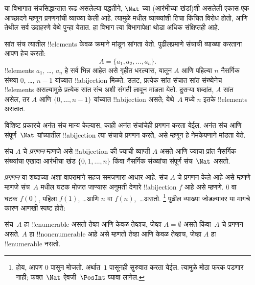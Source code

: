 \documentclass[../../../include/open-logic-section]{subfiles}
\begin{document}


\begin{editorial}
  या विभागात संचसिद्धान्तात रूढ असलेल्या पद्धतीने, $\Nat$ च्या
  (आरंभीच्या खंडां)शी असलेली एकास-एक आच्छादने म्हणून प्रगणनांची
  व्याख्या केली आहे. त्यामुळे  मधील व्याख्यांशी तिचा
  किंचित विरोध होतो, आणि तेथील सर्व उदाहरणे येथे पुन्हा येतात. हा
  विभाग त्या विभागापेक्षा थोडा अधिक संक्षिप्तही आहे.
\end{editorial}

सांत संच त्यातील !!{element}s केवळ क्रमाने मांडून सांगता येतो. पुढीलप्रमाणे
संचाची व्याख्या करताना आपण हेच करतो:
\[
  A = \{a_1, a_2, \ldots, a_n\}.
\]
!!{element}s $a_1$, \dots, $a_n$ हे सर्व भिन्न आहेत असे गृहीत धरल्यास,
यातून $A$ आणि पहिल्या $n$ नैसर्गिक संख्या $0$, \dots, $n-1$ यांच्यात
!!a{bijection} मिळते. उलट, प्रत्येक सांत संचात सांत संख्येनेच
!!{element}s असल्यामुळे प्रत्येक सांत संच अशी संगती लावून मांडता येतो.
दुसऱ्या शब्दांत, $A$ सांत असेल, तर $A$ आणि $\{0, \dots, n-1\}$
यांच्यात !!a{bijection} असते; येथे~$A$ मध्ये $n$ इतके !!{element}s
असतात.

विशिष्ट प्रकारचे अनंत संच मान्य केल्यास, काही अनंत संचांचेही प्रगणन
करता येईल. अनंत संच आणि संपूर्ण~$\Nat$ यांच्यातील !!a{bijection} त्या
संचाचे प्रगणन करते, असे म्हणून हे नेमकेपणाने मांडता येते.

\begin{defn}[प्रगणनाची संचसैद्धान्तिक व्याख्या]
संच $A$ चे \emph{प्रगणन} म्हणजे असे !!a{bijection} की ज्याची व्याप्ती
$A$ असते आणि ज्याचा प्रांत नैसर्गिक संख्यांचा एखादा आरंभीचा खंड $\{0,
1, \ldots, n\}$ {किंवा} नैसर्गिक संख्यांचा संपूर्ण संच~$\Nat$ असतो.
\end{defn}

\begin{explain}
\emph{प्रगणन} या शब्दाच्या अशा वापरामागे सहज समजणारा आधार आहे.
संच $A$ चे प्रगणन केले आहे असे म्हणणे म्हणजे संच~$A$ मधील घटक मोजत
जाण्यास अनुमती देणारे !!a{bijection} $f$ आहे असे म्हणणे. $0$ वा घटक
$f(0)$, पहिला $f(1)$, \ldots आणि $n$ वा $f(n)$,~\ldots असतो.
\footnote{होय, आपण $0$ पासून मोजतो. अर्थात~$1$ पासूनही सुरुवात करता
येईल. त्यामुळे मोठा फरक पडणार नाही; फक्त~$\Nat$ ऐवजी~$\PosInt$
घ्यावा लागेल.} पुढील व्याख्या जोडल्यावर या मागचे कारण आणखी स्पष्ट होते:
\end{explain}

\begin{defn}
  संच~$A$ हा !!{enumerable} असतो तेव्हा आणि केवळ तेव्हाच, जेव्हा
  $A = \emptyset$ असते किंवा~$A$ चे प्रगणन असते. $A$ हा
  !!{nonenumerable} आहे असे म्हणतो तेव्हा आणि केवळ तेव्हाच, जेव्हा
  $A$ हा !!{enumerable} नसतो.
\end{defn}
\end{document}
